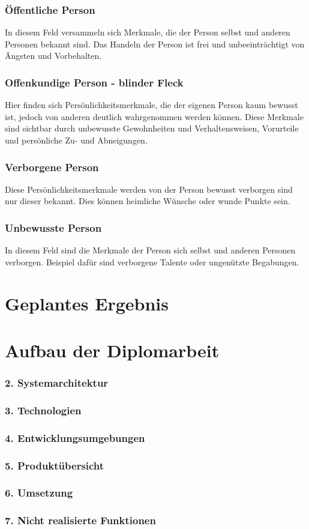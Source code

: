 \subsubsection{Öffentliche Person}
In diesem Feld versammeln sich Merkmale, die der Person selbst und anderen Personen bekannt sind. 
Das Handeln der Person ist frei und unbeeinträchtigt von Ängsten und Vorbehalten.

\subsubsection{Offenkundige Person - blinder Fleck}
Hier finden sich Persönlichkeitsmerkmale, die der eigenen Person kaum bewusst ist, jedoch von anderen deutlich 
wahrgenommen werden können. Diese Merkmale sind sichtbar durch unbewusste Gewohnheiten und Verhaltensweisen, Vorurteile und 
persönliche Zu- und Abneigungen.

\subsubsection{Verborgene Person}
Diese Persönlichkeitsmerkmale werden von der Person bewusst verborgen sind nur dieser bekannt. Dies können 
heimliche Wünsche oder wunde Punkte sein.

\subsubsection{Unbewusste Person}
In diesem Feld sind die Merkmale der Person sich selbst und anderen Personen verborgen. Beispiel dafür sind 
verborgene Talente oder ungenützte Begabungen.

\section{Geplantes Ergebnis}


\section{Aufbau der Diplomarbeit}

\subsubsection{2. Systemarchitektur}


\subsubsection{3. Technologien}


\subsubsection{4. Entwicklungsumgebungen}


\subsubsection{5. Produktübersicht}


\subsubsection{6. Umsetzung}


\subsubsection{7. Nicht realisierte Funktionen}